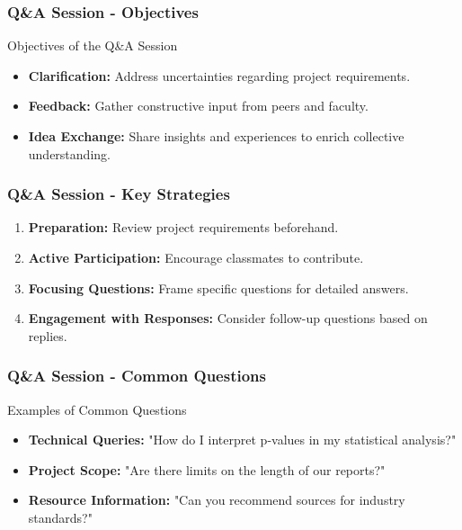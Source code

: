 \documentclass[aspectratio=169]{beamer}
\begin{document}
\begin{frame}[fragile]
    \frametitle{Q\&A Session - Objectives}
    \begin{block}{Objectives of the Q\&A Session}
        \begin{itemize}
            \item \textbf{Clarification:} Address uncertainties regarding project requirements.
            \item \textbf{Feedback:} Gather constructive input from peers and faculty.
            \item \textbf{Idea Exchange:} Share insights and experiences to enrich collective understanding.
        \end{itemize}
    \end{block}
\end{frame}

\begin{frame}[fragile]
    \frametitle{Q\&A Session - Key Strategies}
    \begin{enumerate}
        \item \textbf{Preparation:} Review project requirements beforehand.
        \item \textbf{Active Participation:} Encourage classmates to contribute.
        \item \textbf{Focusing Questions:} Frame specific questions for detailed answers.
        \item \textbf{Engagement with Responses:} Consider follow-up questions based on replies.
    \end{enumerate}
\end{frame}

\begin{frame}[fragile]
    \frametitle{Q\&A Session - Common Questions}
    \begin{block}{Examples of Common Questions}
        \begin{itemize}
            \item \textbf{Technical Queries:} "How do I interpret p-values in my statistical analysis?"
            \item \textbf{Project Scope:} "Are there limits on the length of our reports?"
            \item \textbf{Resource Information:} "Can you recommend sources for industry standards?"
        \end{itemize}
    \end{block}
\end{frame}
\end{document}
